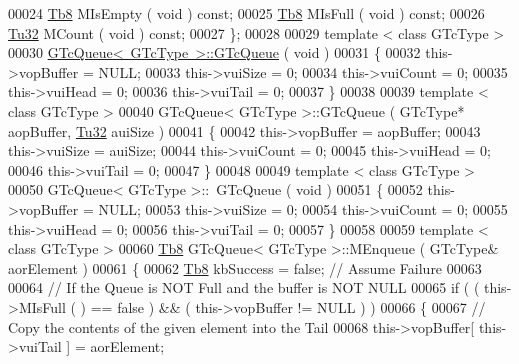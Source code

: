 \begin{DoxyCode}
00024          \mbox{\hyperlink{namespace_g_n_common_a8115dc7ed53b6e5b52e6bfde1632ea74}{Tb8}}  MIsEmpty ( \textcolor{keywordtype}{void} ) \textcolor{keyword}{const};
00025          \mbox{\hyperlink{namespace_g_n_common_a8115dc7ed53b6e5b52e6bfde1632ea74}{Tb8}}  MIsFull  ( \textcolor{keywordtype}{void} ) \textcolor{keyword}{const};
00026          \mbox{\hyperlink{namespace_g_n_common_a941b527ef318f318aed7903dc832b7e4}{Tu32}} MCount   ( \textcolor{keywordtype}{void} ) \textcolor{keyword}{const};
00027       \};
00028 
00029       \textcolor{keyword}{template} < \textcolor{keyword}{class} GTcType >
00030       \mbox{\hyperlink{class_g_n_common_1_1_n_containers_1_1_g_tc_queue}{GTcQueue< GTcType >::GTcQueue}} ( \textcolor{keywordtype}{void} )
00031       \{
00032          this->vopBuffer = NULL;
00033          this->vuiSize   = 0;
00034          this->vuiCount  = 0;
00035          this->vuiHead   = 0;
00036          this->vuiTail   = 0;
00037       \}
00038 
00039       \textcolor{keyword}{template} < \textcolor{keyword}{class} GTcType >
00040       GTcQueue< GTcType >::GTcQueue ( GTcType* aopBuffer, \mbox{\hyperlink{namespace_g_n_common_a941b527ef318f318aed7903dc832b7e4}{Tu32}} auiSize )
00041       \{
00042          this->vopBuffer = aopBuffer;
00043          this->vuiSize   = auiSize;
00044          this->vuiCount  = 0;
00045          this->vuiHead   = 0;
00046          this->vuiTail   = 0;
00047       \}
00048 
00049       \textcolor{keyword}{template} < \textcolor{keyword}{class} GTcType >
00050       GTcQueue< GTcType >::~GTcQueue ( \textcolor{keywordtype}{void} )
00051       \{
00052          this->vopBuffer = NULL;
00053          this->vuiSize   = 0;
00054          this->vuiCount  = 0;
00055          this->vuiHead   = 0;
00056          this->vuiTail   = 0;
00057       \}
00058 
00059       \textcolor{keyword}{template} < \textcolor{keyword}{class} GTcType >
00060       \mbox{\hyperlink{namespace_g_n_common_a8115dc7ed53b6e5b52e6bfde1632ea74}{Tb8}} GTcQueue< GTcType >::MEnqueue ( GTcType& aorElement )
00061       \{
00062          \mbox{\hyperlink{namespace_g_n_common_a8115dc7ed53b6e5b52e6bfde1632ea74}{Tb8}} kbSuccess = \textcolor{keyword}{false}; \textcolor{comment}{// Assume Failure}
00063 
00064          \textcolor{comment}{// If the Queue is NOT Full and the buffer is NOT NULL}
00065          \textcolor{keywordflow}{if} ( ( this->MIsFull ( ) == \textcolor{keyword}{false} ) && ( this->vopBuffer != NULL ) )
00066          \{
00067             \textcolor{comment}{// Copy the contents of the given element into the Tail}
00068             this->vopBuffer[ this->vuiTail ] = aorElement;

\end{DoxyCode}

